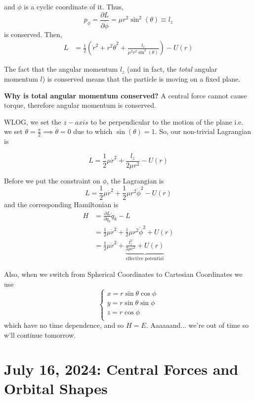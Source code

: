 \documentclass[11pt]{article}
\begin{document}
and $\phi$ is a cyclic coordinate of it. Thus,
\[ p_{\phi} = \frac{\partial L}{\partial \dot{\phi}} = \mu r^2 \sin^2(\theta) \equiv l_z \] is conserved. Then,
\begin{align*}
  L &= \frac{1}{2} \left(\dot{r}^2 + r^2 \dot{\theta}^2 + \frac{l_z}{\mu^2 r^2 \sin^2(\theta)}\right) - U(r)
\end{align*}

\vskip 0.5cm
The fact that the angular momentum $l_z$ (and in fact, the \emph{total} angular momentum $l$) is conserved means that the particle is moving on a fixed plane.

\begin{redbox}
  \textbf{Why is total angular momentum conserved?}
  A central force cannot cause torque, therefore angular momentum is conserved.
\end{redbox}

WLOG, we set the $z-axis$ to be perpendicular to the motion of the plane i.e. we set $\theta = \frac{\pi}{2} \implies \dot{\theta} = 0$ due to which $\sin(\theta) = 1$. So, our non-trivial Lagrangian is 

\[ L = \frac{1}{2}\mu \dot{r}^2 + \frac{l_z}{2\mu r^2} - U(r) \]

Before we put the constraint on $\phi$, the Lagrangian is 
\[ L = \frac{1}{2}\mu \dot{r}^2 + \frac{1}{2} \mu r^2 \dot{\phi}^2 - U(r) \] and the corresponding Hamiltonian is
\begin{align*}
  H &= \frac{\partial L}{\partial \dot{q}_k} \dot{q}_k - L \\
  &= \frac{1}{2}\mu\dot{r}^2 + \frac{1}{2}\mu r^2\dot{\phi}^2 + U(r) \\
  &= \frac{1}{2} \mu \dot{r}^2 + \underbrace{\frac{l_z^2}{2\mu r^2} + U(r)}_{\text{effective potential}}
\end{align*}

Also, when we switch from Spherical Coordinates to Cartesian Coordinates we use 
\[ \begin{cases}
  x = r\sin\theta\cos\phi \\
  y = r\sin\theta\sin\phi \\
  z = r\cos\phi \\
\end{cases} \]
which have no time dependence, and so $H = E$. Aaaaaand... we're out of time so w'll continue tomorrow.


\pagebreak
\section{July 16, 2024: Central Forces and Orbital Shapes}
\end{document}
